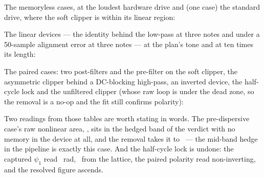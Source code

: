 \documentclass[11pt,a4paper]{article}
\begin{document}
\tparityRemovalStatus

The memoryless cases, at the loudest hardware drive and (one case) the
standard drive, where the soft clipper is within its linear region:

\begin{center}\small\tparityMemorylessTable\end{center}

The linear devices --- the identity behind the low-pass at three notes and
under a 50-sample alignment error at three notes --- at the plan's tone and
at ten times its length:

\begin{center}\small\tparityEllipseTable\end{center}

The paired cases: two post-filters and the pre-filter on the soft clipper,
the asymmetric clipper behind a DC-blocking high-pass, an inverted device,
the half-cycle lock and the unfiltered clipper (whose raw loop is under the
dead zone, so the removal is a no-op and the fit still confirms polarity):

\begin{center}\scriptsize\setlength{\tabcolsep}{4pt}\tparityPairedTable\end{center}

Two readings from those tables are worth stating in words. The
pre-dispersive case's raw nonlinear area, \tparityPrehpRawNonlinear, sits in
the hedged band of the verdict with no memory in the device at all, and the
removal takes it to \tparityPrehpCompNonlinear\ --- the mid-band hedge in
the pipeline is exactly this case. And the half-cycle lock is undone: the
captured $\psi_1$ read \tparityShiftPsi\ rad, \tparityShiftLatticeDistance\
from the lattice, the paired polarity read non-inverting, and the resolved
figure ascends.
\end{document}
